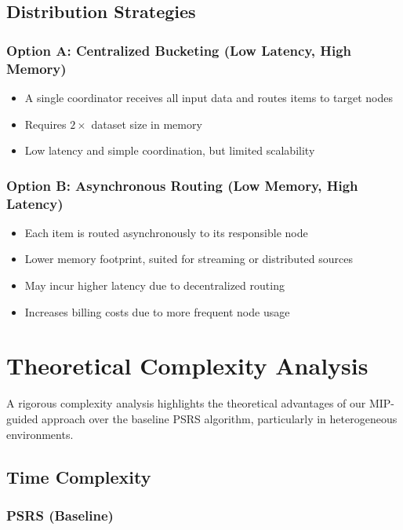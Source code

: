 \documentclass[]{interact}
\theoremstyle{plain}
\theoremstyle{definition}
\theoremstyle{remark}
\begin{document}
\subsection{Distribution Strategies}

\subsubsection{Option A: Centralized Bucketing (Low Latency, High Memory)}
\begin{itemize}
    \item A single coordinator receives all input data and routes items to target nodes
    \item Requires $2 \times$ dataset size in memory
    \item Low latency and simple coordination, but limited scalability
\end{itemize}

\subsubsection{Option B: Asynchronous Routing (Low Memory, High Latency)}
\begin{itemize}
    \item Each item is routed asynchronously to its responsible node
    \item Lower memory footprint, suited for streaming or distributed sources
    \item May incur higher latency due to decentralized routing
    \item Increases billing costs due to more frequent node usage
\end{itemize}







\section{Theoretical Complexity Analysis}

A rigorous complexity analysis highlights the theoretical advantages of our MIP-guided approach over the baseline PSRS algorithm, particularly in heterogeneous environments.

\subsection{Time Complexity}

\subsubsection{PSRS (Baseline)}
\end{document}
